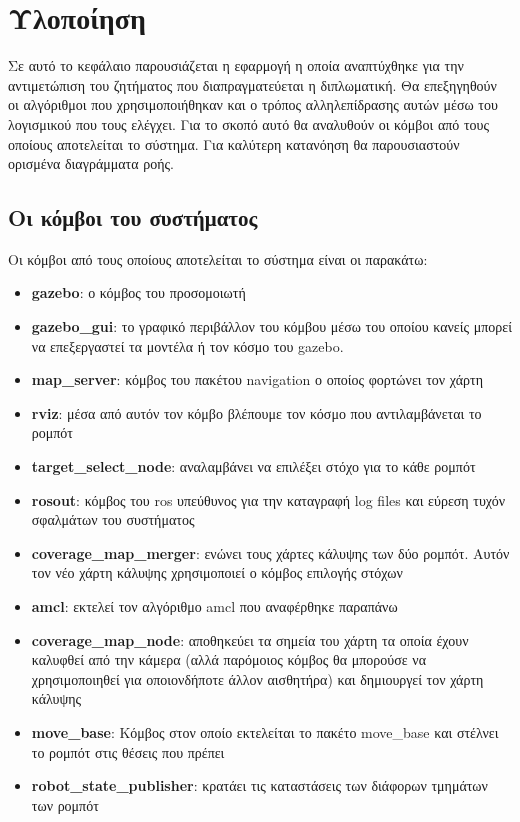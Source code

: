 \section{Υλοποίηση}

Σε αυτό το κεφάλαιο παρουσιάζεται η εφαρμογή η οποία αναπτύχθηκε για την αντιμετώπιση του ζητήματος που διαπραγματεύεται η διπλωματική. Θα επεξηγηθούν οι αλγόριθμοι που χρησιμοποιήθηκαν και ο τρόπος αλληλεπίδρασης αυτών μέσω του λογισμικού που τους ελέγχει. Για το σκοπό αυτό θα αναλυθούν οι κόμβοι από τους οποίους αποτελείται το σύστημα. Για καλύτερη κατανόηση θα παρουσιαστούν ορισμένα διαγράμματα ροής. 

\subsection{Οι κόμβοι του συστήματος}

Οι κόμβοι από τους οποίους αποτελείται το σύστημα είναι οι παρακάτω:  
\begin{itemize}
	\item \textbf{gazebo}: ο κόμβος του προσομοιωτή
	\item \textbf{gazebo\_gui}: το γραφικό περιβάλλον του κόμβου μέσω του οποίου κανείς μπορεί να επεξεργαστεί τα μοντέλα ή τον κόσμο του gazebo.
	\item \textbf{map\_server}: κόμβος του πακέτου navigation ο οποίος φορτώνει τον χάρτη
	\item \textbf{rviz}: μέσα από αυτόν τον κόμβο βλέπουμε τον κόσμο που αντιλαμβάνεται το ρομπότ 
	\item \textbf{target\_select\_node}: αναλαμβάνει να επιλέξει στόχο για το κάθε ρομπότ
	\item \textbf{rosout}: κόμβος του ros υπεύθυνος για την καταγραφή log files και εύρεση τυχόν σφαλμάτων του συστήματος 
	\item \textbf{coverage\_map\_merger}: ενώνει τους χάρτες κάλυψης των δύο ρομπότ. Αυτόν τον νέο χάρτη κάλυψης χρησιμοποιεί ο κόμβος επιλογής στόχων
	\item \textbf{amcl}: εκτελεί τον αλγόριθμο amcl που αναφέρθηκε παραπάνω
	\item \textbf{coverage\_map\_node}: αποθηκεύει τα σημεία του χάρτη τα οποία έχουν καλυφθεί από την κάμερα (αλλά παρόμοιος κόμβος θα μπορούσε να χρησιμοποιηθεί για οποιονδήποτε άλλον αισθητήρα) και δημιουργεί τον χάρτη κάλυψης 
	\item \textbf{move\_base}: Κόμβος στον οποίο εκτελείται το πακέτο move\_base και στέλνει το ρομπότ στις θέσεις που πρέπει
	\item \textbf{robot\_state\_publisher}: κρατάει τις καταστάσεις των διάφορων τμημάτων των ρομπότ
\end{itemize}

